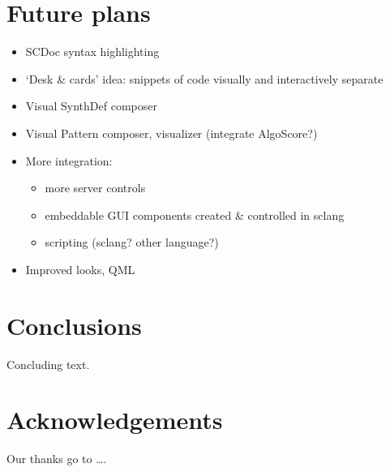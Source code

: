 \documentclass[11pt,a4paper]{article}
\begin{document}
\section{Future plans}

\begin{itemize}
 \item SCDoc syntax highlighting
 \item `Desk \& cards' idea: snippets of code visually and interactively separate
 \item Visual SynthDef composer
 \item Visual Pattern composer, visualizer (integrate AlgoScore?)
 \item More integration:
 \begin{itemize}
    \item more server controls
    \item  embeddable GUI components created \& controlled in sclang
    \item  scripting (sclang? other language?)
 \end{itemize}
 \item Improved looks, QML
\end{itemize}

\section{Conclusions}

Concluding text.

\section{Acknowledgements}

Our thanks go to \ldots .



\end{document}
